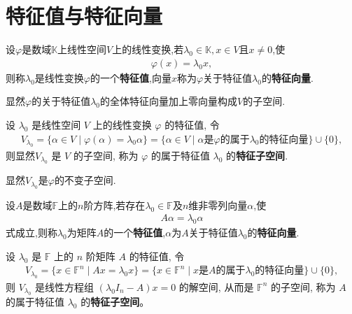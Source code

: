 \documentclass[../../main.tex]{subfiles}
\begin{document}
\section{特征值与特征向量}

\begin{definition}[线性变换的特征值和特征向量]
设$\varphi$是数域$\mathbb{K}$上线性空间$V$上的线性变换,若$\lambda_0 \in \mathbb{K}, x \in V$且$x \neq 0$,使
\begin{align*}
\varphi(x) = \lambda_0 x,
\end{align*}
则称$\lambda_0$是线性变换$\varphi$的一个\textbf{特征值},向量$x$称为$\varphi$关于特征值$\lambda_0$的\textbf{特征向量}.
\end{definition}
\begin{note}
显然$\varphi$的关于特征值$\lambda_0$的全体特征向量加上零向量构成$V$的子空间.
\end{note}

\begin{definition}[线性变换的特征子空间]
设 $\lambda_0$ 是线性空间 $V$ 上的线性变换 $\varphi$ 的特征值, 令
\begin{align*}
V_{\lambda_0} = \{\alpha \in V \mid \varphi(\alpha) = \lambda_0 \alpha\} 
= \{\alpha \in V \mid \alpha \text{是} \varphi \text{的属于} \lambda_0 \text{的特征向量}\} \cup \{0\},
\end{align*}
则显然$V_{\lambda_0}$ 是 $V$ 的子空间, 称为 $\varphi$ 的属于特征值 $\lambda_0$ 的\textbf{特征子空间}.
\end{definition}
\begin{note}
显然$V_{\lambda_0}$是$\varphi$的不变子空间.
\end{note}

\begin{definition}[矩阵的特征值和特征向量]
设$A$是数域$\mathbb{F}$上的$n$阶方阵,若存在$\lambda_0 \in \mathbb{F}$及$n$维非零列向量$\alpha$,使
\begin{align*}
A \alpha = \lambda_0 \alpha
\end{align*}
式成立,则称$\lambda_0$为矩阵$A$的一个\textbf{特征值},$\alpha$为$A$关于特征值$\lambda_0$的\textbf{特征向量}.
\end{definition}

\begin{definition}[矩阵的特征子空间]
设 $\lambda_0$ 是 $\mathbb{F}$ 上的 $n$ 阶矩阵 $A$ 的特征值, 令
\begin{align*}
V_{\lambda_0} = \{x \in \mathbb{F}^n \mid Ax = \lambda_0 x\} 
= \{x \in \mathbb{F}^n \mid x \text{是} A \text{的属于} \lambda_0 \text{的特征向量}\} \cup \{0\},
\end{align*}
则 $V_{\lambda_0}$ 是线性方程组 $(\lambda_0 I_n - A)x = 0$ 的解空间, 从而是 $\mathbb{F}^n$ 的子空间, 称为 $A$ 的属于特征值 $\lambda_0$ 的\textbf{特征子空间}。
\end{definition}
\end{document}
